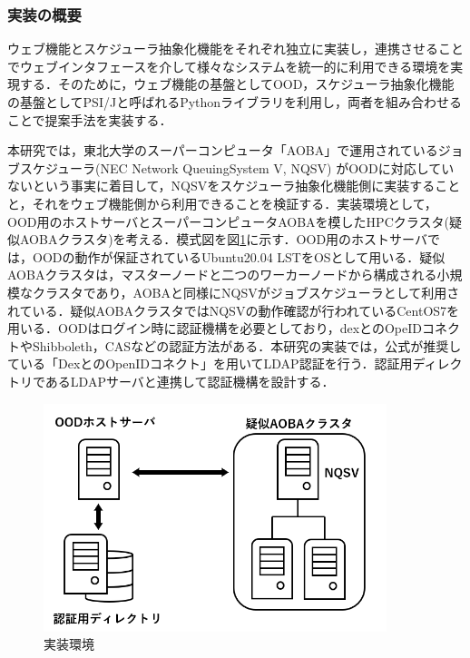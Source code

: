 \subsubsection{実装の概要}
ウェブ機能とスケジューラ抽象化機能をそれぞれ独立に実装し，連携させることでウェブインタフェースを介して様々なシステムを統一的に利用できる環境を実現する．そのために，ウェブ機能の基盤としてOOD，スケジューラ抽象化機能の基盤としてPSI/J\cite{cite5}と呼ばれるPythonライブラリを利用し，両者を組み合わせることで提案手法を実装する．\par
本研究では，東北大学のスーパーコンピュータ「AOBA」で運用されているジョブスケジューラ(NEC Network QueuingSystem V, NQSV) がOODに対応していないという事実に着目して，NQSVをスケジューラ抽象化機能側に実装することと，それをウェブ機能側から利用できることを検証する．実装環境として，OOD用のホストサーバとスーパーコンピュータAOBAを模したHPCクラスタ(疑似AOBAクラスタ)を考える．模式図を図\ref{fig7}に示す．OOD用のホストサーバでは，OODの動作が保証されているUbuntu20.04 LSTをOSとして用いる．疑似AOBAクラスタは，マスターノードと二つのワーカーノードから構成される小規模なクラスタであり，AOBAと同様にNQSVがジョブスケジューラとして利用されている．疑似AOBAクラスタではNQSVの動作確認が行われているCentOS7を用いる．OODはログイン時に認証機構を必要としており，dexとのOpeIDコネクトやShibboleth，CASなどの認証方法がある．本研究の実装では，公式が推奨している「DexとのOpenIDコネクト」を用いてLDAP認証を行う\cite{cite7}\cite{cite8}．認証用ディレクトリであるLDAPサーバと連携して認証機構を設計する．\par

\begin{figure}[tb]
    \centering
    \includegraphics[width=100mm]{./fig/environment.png}
    \caption{実装環境}
    \label{fig7}
\end{figure}


